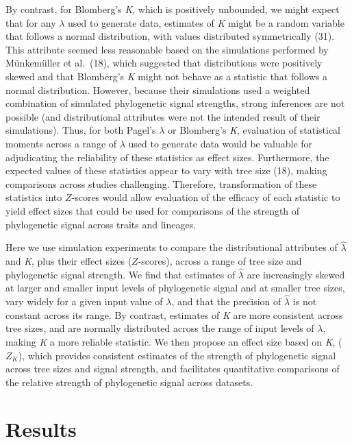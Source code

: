 \documentclass[9pt,twocolumn,twoside,lineno]{pnas-new}
\begin{document}
By contrast, for Blomberg's \emph{K}, which is positively unbounded, we
might expect that for any \(\lambda\) used to generate data, estimates
of \emph{K} might be a random variable that follows a normal
distribution, with values distributed symmetrically (31). This attribute
seemed less reasonable based on the simulations performed by Münkemüller
et al.~(18), which suggested that distributions were positively skewed
and that Blomberg's \emph{K} might not behave as a statistic that
follows a normal distribution. However, because their simulations used a
weighted combination of simulated phylogenetic signal strengths, strong
inferences are not possible (and distributional attributes were not the
intended result of their simulations). Thus, for both Pagel's
\(\lambda\) or Blomberg's \emph{K}, evaluation of statistical moments
across a range of \(\lambda\) used to generate data would be valuable
for adjudicating the reliability of these statistics as effect sizes.
Furthermore, the expected values of these statistics appear to vary with
tree size (18), making comparisons across studies challenging.
Therefore, transformation of these statistics into \(Z\)-scores would
allow evaluation of the efficacy of each statistic to yield effect sizes
that could be used for comparisons of the strength of phylogenetic
signal across traits and lineages.

Here we use simulation experiments to compare the distributional
attributes of \(\hat{\lambda}\) and \emph{K}, plus their effect sizes
(\(Z\)-scores), across a range of tree size and phylogenetic signal
strength. We find that estimates of \(\hat{\lambda}\) are increasingly
skewed at larger and smaller input levels of phylogenetic signal and at
smaller tree sizes, vary widely for a given input value of \(\lambda\),
and that the precision of \(\hat{\lambda}\) is not constant across its
range. By contrast, estimates of \emph{K} are more consistent across
tree sizes, and are normally distributed across the range of input
levels of \(\lambda\), making \emph{K} a more reliable statistic. We
then propose an effect size based on \emph{K}, (\(Z_K\)), which provides
consistent estimates of the strength of phylogenetic signal across tree
sizes and signal strength, and facilitates quantitative comparisons of
the relative strength of phylogenetic signal across datasets.

\hypertarget{results}{%
\section{Results}\label{results}}
\end{document}
